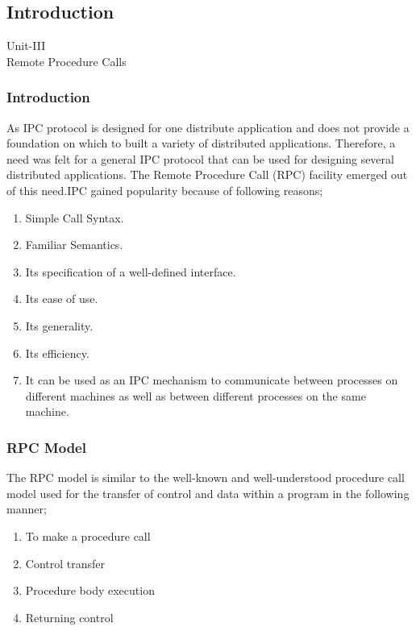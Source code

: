 \documentclass{beamer}
\begin{document}
\subsection{Introduction}
\begin{frame}
	\centering
	\large Unit-III\\
	\huge Remote Procedure Calls
\end{frame}

\begin{frame}
	\frametitle{Introduction}
	As IPC protocol is designed for one distribute application and does not provide a 
	foundation on which to built a variety of distributed applications. Therefore, a need 
	was felt for  a general IPC protocol that can be used  for designing several 
	distributed applications. The Remote Procedure Call (RPC) facility emerged out of this 
	need.IPC gained popularity because of following reasons;
	\begin{enumerate}
		\item Simple Call Syntax.
		\item Familiar Semantics.
		\item Its specification of a well-defined interface.
		\item Its ease of use.
		\item Its generality.
		\item Its efficiency.
		\item It can be used as an IPC mechanism to communicate between processes on 
		different machines as well as between different processes on the same machine.
	\end{enumerate}		
\end{frame}

\begin{frame}
	\frametitle{RPC Model}
	The RPC model is similar to the well-known and well-understood procedure call model used for the transfer of control and data within a program in the following manner;
	\begin{enumerate}
		\item To make a procedure call
		\item Control transfer
		\item Procedure body execution
		\item Returning control
	\end{enumerate}
	\\
	\vspace{2cm}
\end{frame}
\end{document}
